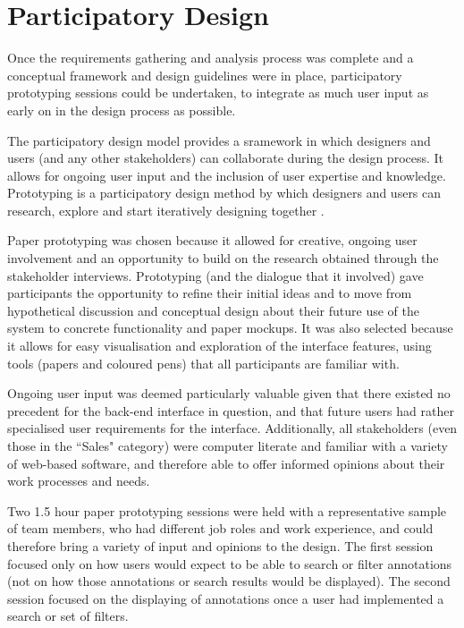 \section{Participatory Design}
Once the requirements gathering and analysis process was complete and a conceptual framework and design guidelines were in place, participatory prototyping sessions could be undertaken, to integrate as much user input as early on in the design process as possible. 

The participatory design model provides a sramework in which designers and users (and any other stakeholders) can collaborate during the design process. It allows for ongoing user input and the inclusion of user expertise and knowledge. Prototyping is a participatory design method by which designers and users can research, explore and start iteratively designing together \citep{Spinuzzi}.   

Paper prototyping was chosen because it allowed for creative, ongoing user involvement and an opportunity to build on the research obtained through the stakeholder interviews. Prototyping (and the dialogue that it involved) gave participants the opportunity to refine their initial ideas and to move from hypothetical discussion and conceptual design about their future use of the system to concrete functionality and paper mockups. It was also selected because it allows for easy visualisation and exploration of the interface features, using tools (papers and coloured pens) that all participants are familiar with\citep[p. 380]{HackosRedish}. 

Ongoing user input was deemed particularly valuable given that there existed no precedent for the back-end interface in question, and that future users had rather specialised user requirements for the interface. Additionally, all stakeholders (even those in the ``Sales" category) were computer literate and familiar with a variety of web-based software, and therefore able to offer informed opinions about their work processes and needs. 

Two 1.5 hour paper prototyping sessions were held with a representative sample of team members, who had different job roles and work experience, and could therefore bring a variety of input and opinions to the design. The first session focused only on how users would expect to be able to search or filter annotations (not on how those annotations or search results would be displayed). The second session focused on the displaying of annotations once a user had implemented a search or set of filters. 

